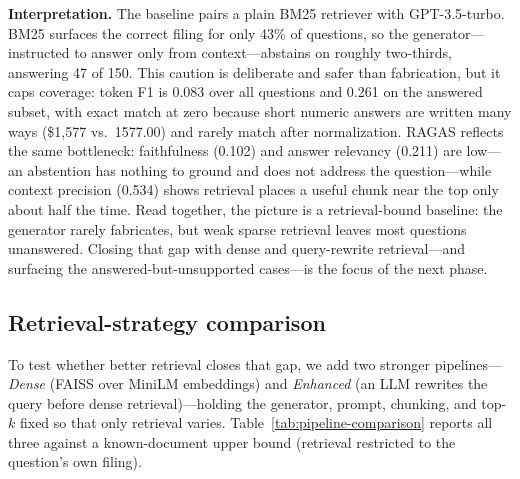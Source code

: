 \documentclass[11pt]{article}
\begin{document}


\textbf{Interpretation.}
The baseline pairs a plain BM25 retriever with GPT-3.5-turbo. BM25 surfaces the
correct filing for only 43\% of questions, so the generator---instructed to
answer only from context---abstains on roughly two-thirds, answering 47 of 150.
This caution is deliberate and safer than fabrication, but it caps coverage:
token F1 is 0.083 over all questions and 0.261 on the answered subset, with exact
match at zero because short numeric answers are written many ways
(\$1{,}577 vs.\ 1577.00) and rarely match after normalization. RAGAS reflects the
same bottleneck: faithfulness (0.102) and answer relevancy (0.211) are low---an
abstention has nothing to ground and does not address the question---while
context precision (0.534) shows retrieval places a useful chunk near the top only
about half the time. Read together, the picture is a retrieval-bound baseline:
the generator rarely fabricates, but weak sparse retrieval leaves most questions
unanswered. Closing that gap with dense and query-rewrite retrieval---and
surfacing the answered-but-unsupported cases---is the focus of the next phase.

\subsection{Retrieval-strategy comparison}
\label{sec:comparison}
To test whether better retrieval closes that gap, we add two stronger pipelines---
\emph{Dense} (FAISS over MiniLM embeddings) and \emph{Enhanced} (an LLM rewrites the
query before dense retrieval)---holding the generator, prompt, chunking, and top-$k$
fixed so that only retrieval varies. Table~\ref{tab:pipeline-comparison} reports all
three against a known-document upper bound (retrieval restricted to the question's own
filing).


\end{document}
